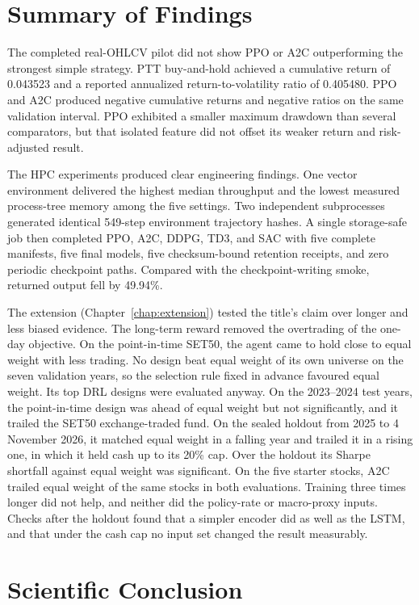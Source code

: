 \documentclass[12pt,a4paper,oneside]{book}
\begin{document}
\section{Summary of Findings}

The completed real-OHLCV pilot did not show PPO or A2C outperforming the strongest simple strategy. PTT buy-and-hold achieved a cumulative return of 0.043523 and a reported annualized return-to-volatility ratio of 0.405480. PPO and A2C produced negative cumulative returns and negative ratios on the same validation interval. PPO exhibited a smaller maximum drawdown than several comparators, but that isolated feature did not offset its weaker return and risk-adjusted result.

The HPC experiments produced clear engineering findings. One vector environment delivered the highest median throughput and the lowest measured process-tree memory among the five settings. Two independent subprocesses generated identical 549-step environment trajectory hashes. A single storage-safe job then completed PPO, A2C, DDPG, TD3, and SAC with five complete manifests, five final models, five checksum-bound retention receipts, and zero periodic checkpoint paths. Compared with the checkpoint-writing smoke, returned output fell by 49.94\%.

The extension (Chapter~\ref{chap:extension}) tested the title's claim over longer and less biased evidence. The long-term reward removed the overtrading of the one-day objective. On the point-in-time SET50, the agent came to hold close to equal weight with less trading. No design beat equal weight of its own universe on the seven validation years, so the selection rule fixed in advance favoured equal weight. Its top DRL designs were evaluated anyway. On the 2023--2024 test years, the point-in-time design was ahead of equal weight but not significantly, and it trailed the SET50 exchange-traded fund. On the sealed holdout from 2025 to 4 November 2026, it matched equal weight in a falling year and trailed it in a rising one, in which it held cash up to its 20\% cap. Over the holdout its Sharpe shortfall against equal weight was significant. On the five starter stocks, A2C trailed equal weight of the same stocks in both evaluations. Training three times longer did not help, and neither did the policy-rate or macro-proxy inputs. Checks after the holdout found that a simpler encoder did as well as the LSTM, and that under the cash cap no input set changed the result measurably.

\section{Scientific Conclusion}
\end{document}
